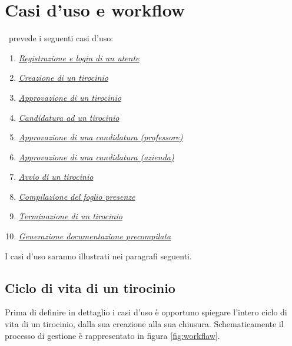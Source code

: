 \chapter{Casi d'uso e workflow}

\projectName~prevede i seguenti casi d'uso:
\begin{enumerate}
	\item \hyperref[sec:registrazione-e-login-di-un-utente]{\textit{Registrazione e login di un utente}}
	\item \hyperref[sec:creazione--di-un-tirocinio]{\textit{Creazione di un tirocinio}}
	\item \hyperref[sec:approvazione-di-un-tirocinio]{\textit{Approvazione di un tirocinio}}
	\item \hyperref[sec:candidatura-ad-un-tirocinio]{\textit{Candidatura ad un tirocinio}}
	\item \hyperref[sec:approvazione-candidatura-professore]{\textit{Approvazione di una candidatura (professore)}}
	\item \hyperref[sec:approvazione-candidatura-azienda]{\textit{Approvazione di una candidatura (azienda)}}
	\item \hyperref[sec:avvio-di-un-tirocinio]{\textit{Avvio di un tirocinio}}
	\item \hyperref[sec:compilazione-foglio-presenze]{\textit{Compilazione del foglio presenze}}
	\item \hyperref[sec:terminazione-di-un-tirocinio]{\textit{Terminazione di un tirocinio}}
	\item \hyperref[sec:generazione-documentazione]{\textit{Generazione documentazione precompilata}}
\end{enumerate}
I casi d'uso saranno illustrati nei paragrafi seguenti.

\section{Ciclo di vita di un tirocinio}
Prima di definire in dettaglio i casi d'uso è opportuno spiegare l'intero ciclo di vita di un tirocinio, dalla sua creazione alla sua chiusura. Schematicamente il processo di gestione è rappresentato in figura \ref{fig:workflaw}.

